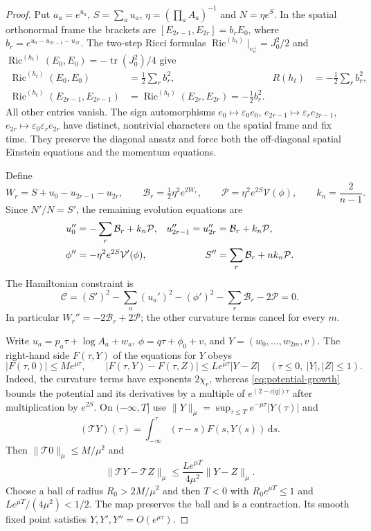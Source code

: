 \documentclass[10pt,a4paper]{article}
\numberwithin{equation}{section}
\theoremstyle{definition}
\theoremstyle{remark}
\newcommand{\dd}{\mathrm d}
\newcommand{\Ric}{\operatorname{Ric}}
\begin{document}
\begin{proof}
Put $a_a=e^{u_a}$, $S=\sum_a u_a$,
$\eta=(\prod_a A_a)^{-1}$ and $N=\eta e^S$.
In the spatial orthonormal frame the brackets are
$[E_{2r-1},E_{2r}]=b_rE_0$, where
$b_r=e^{u_0-u_{2r-1}-u_{2r}}$.
The two-step Ricci formulas
$\Ric^{(h_t)}|_{e_0^\perp}=J_0^2/2$ and
$\Ric^{(h_t)}(E_0,E_0)=-\operatorname{tr}(J_0^2)/4$ give
\begin{equation}
 \begin{aligned}
 \Ric^{(h_t)}(E_0,E_0)&=\tfrac12\sum_r b_r^2,
 &R(h_t)&=-\tfrac12\sum_r b_r^2,\\
 \Ric^{(h_t)}(E_{2r-1},E_{2r-1})
 &=\Ric^{(h_t)}(E_{2r},E_{2r})=-\tfrac12b_r^2.
 \end{aligned}
 \label{eq:h5-spatial-ricci}
\end{equation}
All other entries vanish.  The sign automorphisms
$e_0\mapsto\varepsilon_0e_0$,
$e_{2r-1}\mapsto\varepsilon_re_{2r-1}$,
$e_{2r}\mapsto\varepsilon_0\varepsilon_re_{2r}$ have distinct,
nontrivial characters on the spatial frame and fix time.  They preserve
the diagonal ansatz and force both the off-diagonal spatial Einstein
equations and the momentum equations.

Define
\[
 W_r=S+u_0-u_{2r-1}-u_{2r},\qquad
 \mathcal B_r=\tfrac12\eta^2e^{2W_r},\qquad
 \mathcal P=\eta^2e^{2S}\mathcal V(\phi),\qquad k_n=\frac2{n-1}.
\]
Since $N'/N=S'$, the remaining evolution equations are
\begin{align}
 u_0''&=-\sum_r\mathcal B_r+k_n\mathcal P,
 &u_{2r-1}''=u_{2r}''&=\mathcal B_r+k_n\mathcal P,\notag\\
 \phi''&=-\eta^2e^{2S}\mathcal V'(\phi),
 &S''&=\sum_r\mathcal B_r+nk_n\mathcal P.
 \label{eq:h5-harmonic-evolution}
\end{align}
The Hamiltonian constraint is
\begin{equation}
 \mathcal C=(S')^2-\sum_a(u_a')^2-(\phi')^2
                   -\sum_r\mathcal B_r-2\mathcal P=0.
 \label{eq:h5-hamiltonian}
\end{equation}
In particular $W_r''=-2\mathcal B_r+2\mathcal P$; the other curvature
terms cancel for every $m$.

Write $u_a=p_a\tau+\log A_a+w_a$,
$\phi=q\tau+\phi_0+v$, and $Y=(w_0,\ldots,w_{2m},v)$.
The right-hand side $F(\tau,Y)$ of the equations for $Y$ obeys
\[
 |F(\tau,0)|\le Me^{\mu\tau},\qquad
 |F(\tau,Y)-F(\tau,Z)|\le Le^{\mu\tau}|Y-Z|
 \quad(\tau\le0,\ |Y|,|Z|\le1).
\]
Indeed, the curvature terms have exponents $2\chi_r$, whereas
\eqref{eq:potential-growth} bounds the potential and its derivatives
by a multiple of $e^{(2-c|q|)\tau}$ after multiplication by $e^{2S}$.
On $(-\infty,T]$ use
$\|Y\|_\mu=\sup_{\tau\le T}e^{-\mu\tau}|Y(\tau)|$ and
\[
 (\mathcal TY)(\tau)=
       \int_{-\infty}^{\tau}(\tau-s)F(s,Y(s))\,\dd s.
\]
Then $\|\mathcal T0\|_\mu\le M/\mu^2$ and
\[
 \|\mathcal TY-\mathcal TZ\|_\mu
       \le\frac{Le^{\mu T}}{4\mu^2}\|Y-Z\|_\mu.
\]
Choose a ball of radius $R_0>2M/\mu^2$ and then $T<0$ with
$R_0e^{\mu T}\le1$ and $Le^{\mu T}/(4\mu^2)<1/2$.
The map preserves the ball and is a contraction.  Its smooth fixed point
satisfies $Y,Y',Y''=O(e^{\mu\tau})$.


\end{proof}
\end{document}
